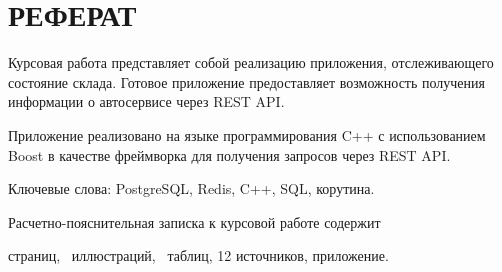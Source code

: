 
\setcounter{page}{3}

\chapter*{РЕФЕРАТ}

Курсовая работа представляет собой реализацию приложения, отслеживающего состояние склада. Готовое приложение предоставляет возможность получения информации о автосервисе через REST API.

Приложение реализовано на языке программирования C++ с использованием Boost в качестве фреймворка для получения запросов через REST API.

Ключевые слова: PostgreSQL, Redis, C++, SQL, корутина.

Расчетно-пояснительная записка к курсовой работе содержит  \begin{NoHyper}\pageref{LastPage}\end{NoHyper} страниц, \totfig~иллюстраций, \tottab~таблиц, 12 источников,  приложение.
